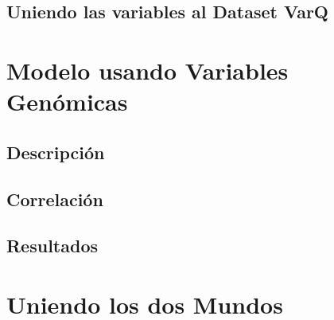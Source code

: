 \subsection{Uniendo las variables al Dataset VarQ}

\section{Modelo usando Variables Genómicas}
\subsection{Descripción}
\subsection{Correlación}

\subsection{Resultados}

\section{Uniendo los dos Mundos}

